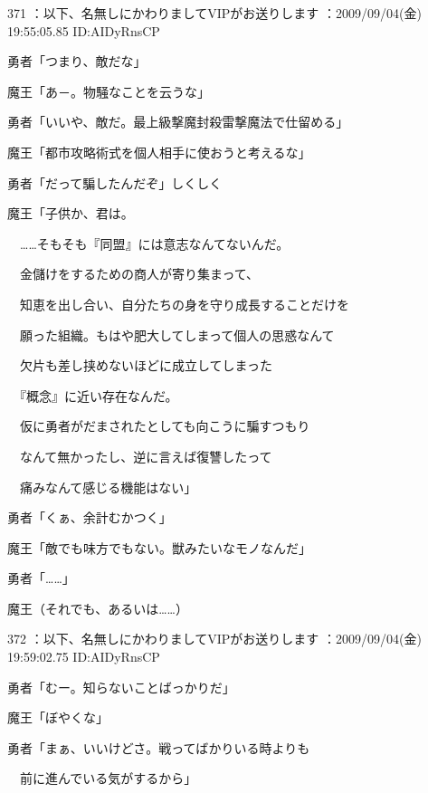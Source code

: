\documentclass[a4j,twocolumn]{tarticle}
\begin{document}
	
    
    

371 ：以下、名無しにかわりましてVIPがお送りします ：2009/09/04(金) 19:55:05.85 ID:AIDyRnsCP 


勇者「つまり、敵だな」\par{} 
魔王「あ－。物騒なことを云うな」 



勇者「いいや、敵だ。最上級撃魔封殺雷撃魔法で仕留める」\par{} 
魔王「都市攻略術式を個人相手に使おうと考えるな」 



勇者「だって騙したんだぞ」しくしく 



魔王「子供か、君は。\par{} 
　……そもそも『同盟』には意志なんてないんだ。\par{} 
　金儲けをするための商人が寄り集まって、 \par{}
　知恵を出し合い、自分たちの身を守り成長することだけを\par{} 
　願った組織。もはや肥大してしまって個人の思惑なんて\par{} 
　欠片も差し挟めないほどに成立してしまった\par{} 
　『概念』に近い存在なんだ。\par{} 
　仮に勇者がだまされたとしても向こうに騙すつもり\par{} 
　なんて無かったし、逆に言えば復讐したって\par{} 
　痛みなんて感じる機能はない」 



勇者「くぁ、余計むかつく」 



魔王「敵でも味方でもない。獣みたいなモノなんだ」\par{} 
勇者「……」 



魔王（それでも、あるいは……） 

	
    
    

372 ：以下、名無しにかわりましてVIPがお送りします ：2009/09/04(金) 19:59:02.75 ID:AIDyRnsCP 


勇者「むー。知らないことばっかりだ」\par{} 
魔王「ぼやくな」\par{} 
勇者「まぁ、いいけどさ。戦ってばかりいる時よりも\par{} 
　前に進んでいる気がするから」 
\end{document}
